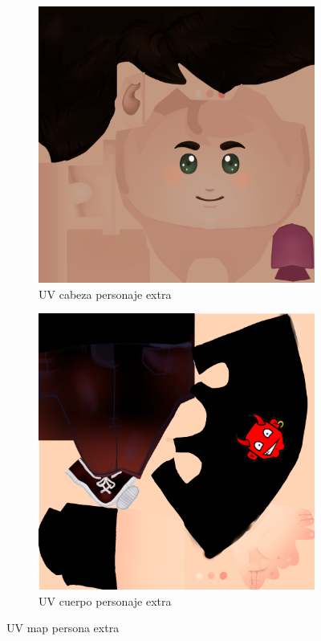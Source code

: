\documentclass[12pt, a4paper,twoside,titlepage]{book}
\begin{document}
 \begin{figure}
\centering
\begin{subfigure}{.5\textwidth}
  \centering
  \includegraphics[width=.95\linewidth]{TGF/Artes/EVIL_head.png}
  \caption{UV cabeza personaje extra}
\end{subfigure}%
\begin{subfigure}{.5\textwidth}
  \centering
  \includegraphics[width=.95\linewidth]{TGF/Artes/EVIL_body.png}
  \caption{UV cuerpo personaje extra}
\end{subfigure}
\caption{UV map persona extra}
\label{fig:ArtesEVIL1}
\end{figure}
\end{document}
